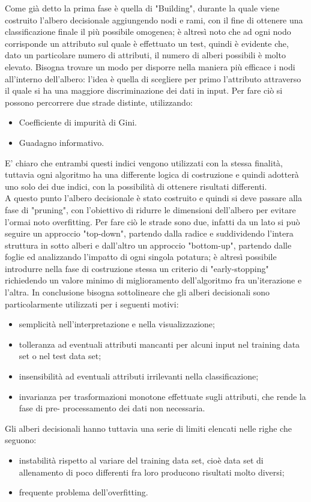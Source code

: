 Come già detto la prima fase è quella di "Building", durante la quale viene costruito l'albero decisionale aggiungendo nodi e rami, con il fine di ottenere una classificazione finale il più possibile omogenea; è altresì noto che ad ogni nodo corrisponde un attributo sul quale è effettuato un test, quindi è evidente che, dato un particolare numero di attributi, il numero di alberi possibili è molto elevato. Bisogna trovare un modo per disporre nella maniera più efficace i nodi all'interno dell'albero: l'idea è quella di scegliere per primo l'attributo attraverso il quale si ha una maggiore discriminazione dei dati in input. Per fare ciò si possono percorrere due strade distinte, utilizzando:
\begin{itemize}
	\item Coefficiente di impurità di Gini. 
	\item Guadagno informativo. 
\end{itemize} 
E' chiaro che entrambi questi indici vengono utilizzati con la stessa finalità, tuttavia ogni algoritmo ha una differente logica di costruzione e quindi adotterà uno solo dei due indici, con la possibilità di ottenere risultati differenti. \\
A questo punto l'albero decisionale è stato costruito e quindi si deve passare alla fase di "pruning", con l'obiettivo di ridurre le dimensioni dell'albero per evitare l'ormai noto overfitting. Per fare ciò le strade sono due, infatti da un lato si può seguire un approccio "top-down", partendo dalla radice e suddividendo l'intera struttura in sotto alberi e dall'altro un approccio "bottom-up", partendo dalle foglie ed analizzando l'impatto di ogni singola potatura; è altresì possibile introdurre nella fase di costruzione stessa un criterio di "early-stopping" richiedendo un valore minimo di miglioramento dell'algoritmo fra un'iterazione e l'altra.
\newpage
In conclusione bisogna sottolineare che gli alberi decisionali sono particolarmente utilizzati per i seguenti motivi:
\begin{itemize}
	\item semplicità nell'interpretazione e nella visualizzazione;
	\item tolleranza ad eventuali attributi mancanti per alcuni input nel training data set o nel test data set;
	\item insensibilità ad eventuali attributi irrilevanti nella classificazione;
	\item invarianza per trasformazioni monotone effettuate sugli attributi, che rende la fase di pre- processamento dei dati non necessaria. 
\end{itemize}
Gli alberi decisionali hanno tuttavia una serie di limiti elencati nelle righe che seguono:
\begin{itemize}
	\item instabilità rispetto al variare del training data set, cioè data set di allenamento di poco differenti fra loro producono risultati molto diversi;
	\item frequente problema dell'overfitting.
\end{itemize}

